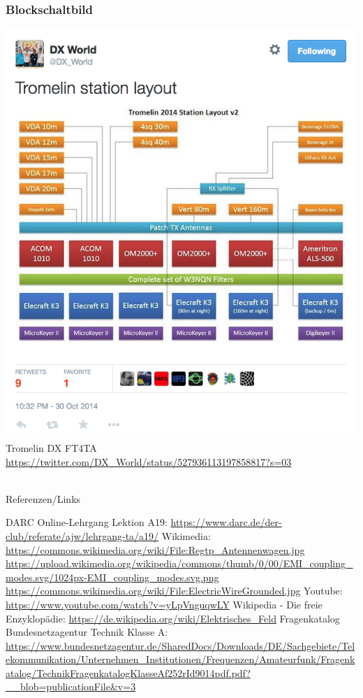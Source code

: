 \begin{frame}
  \frametitle{Blockschaltbild}
  \begin{center}
    \includegraphics[width=\textwidth,height=0.8\textheight,keepaspectratio]{a19/BsB.png}\\
    {\tiny Tromelin DX FT4TA \url{https://twitter.com/DX_World/status/527936113197858817?s=03}}
  \end{center}
\end{frame}

\renewcommand{\refname}{Referenzen}

\hypertarget{refs}{}
\textcolor{white}{} \\ %
\Large Referenzen/Links
\footnotesize

\begin{thebibliography}{}
    DARC Online-Lehrgang Lektion A19:
    \url{https://www.darc.de/der-club/referate/ajw/lehrgang-ta/a19/}
    Wikimedia:
    \url{https://commons.wikimedia.org/wiki/File:Regtp_Antennenwagen.jpg}
    \url{https://upload.wikimedia.org/wikipedia/commons/thumb/0/00/EMI_coupling_modes.svg/1024px-EMI_coupling_modes.svg.png}
    \url{https://commons.wikimedia.org/wiki/File:ElectricWireGrounded.jpg}
    Youtube:
    \url{https://www.youtube.com/watch?v=yLpVnguqwLY}
      Wikipedia - Die freie Enzyklopädie:
    \url{https://de.wikipedia.org/wiki/Elektrisches_Feld}
     Fragenkatalog Bundesnetzagentur Technik Klasse A:
    \url{https://www.bundesnetzagentur.de/SharedDocs/Downloads/DE/Sachgebiete/Telekommunikation/Unternehmen_Institutionen/Frequenzen/Amateurfunk/Fragenkatalog/TechnikFragenkatalogKlasseAf252rId9014pdf.pdf?__blob=publicationFile&v=3}
\end{thebibliography}


